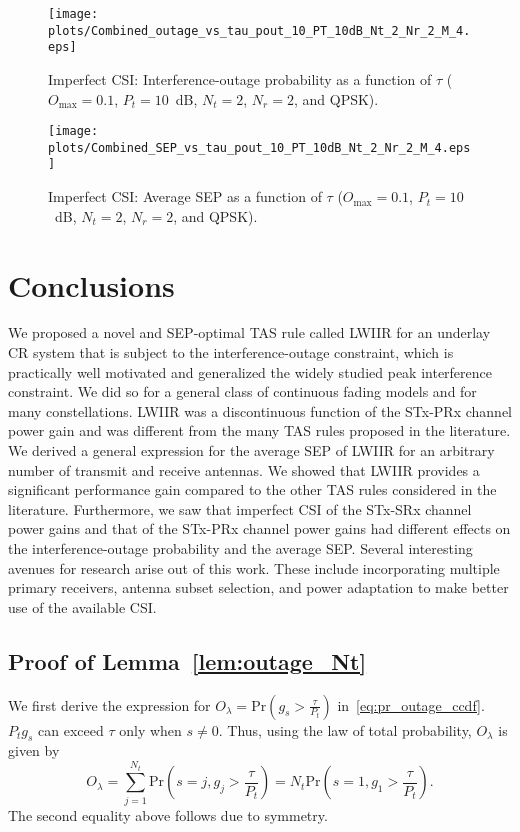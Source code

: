 \documentclass[12pt,draftcls,peerreview,onecolumn]{IEEEtran}
\newcommand{\brac}[1]{\left({#1}\right)}
\newcommand{\prob}[1]{\text{Pr}\brac{#1}}
\newcommand{\lam}{\lambda}
\newcommand{\Nt}{{N_t}}
\newcommand{\Nr}{{N_r}}
\newcommand{\Pt}{{P_t}}
\newcommand{\puch}{g}
\newcommand{\gk}[1]{{\puch_{#1}}}
\newcommand{\outmax}{O_{\text{max}}}
\newcommand{\itau}{\tau}
\newcommand{\out}{O}
\newcommand{\taubypt}{\frac{\itau}{\Pt}}
\newcommand{\gkgrtaubypt}[1]{{\gk{#1}}>\taubypt}
\newcommand{\outlam}{\out_{\lam}}
\begin{document}
\begin{figure}
	\centering
	 \texttt{[image: plots/Combined\_outage\_vs\_tau\_pout\_10\_PT\_10dB\_Nt\_2\_Nr\_2\_M\_4.eps]}
	\caption{Imperfect CSI: Interference-outage probability as a function of $\itau$ ($\outmax=0.1$, $\Pt = 10$~dB, $\Nt = 2$, $\Nr = 2$, and QPSK).}
	\label{fig:out_vs_tau_imp_CSI}
\end{figure}


\begin{figure}
	\centering \texttt{[image: plots/Combined\_SEP\_vs\_tau\_pout\_10\_PT\_10dB\_Nt\_2\_Nr\_2\_M\_4.eps]}
	\caption{Imperfect CSI: Average SEP as a function of $\itau$ ($\outmax=0.1$, $\Pt = 10$~dB, $\Nt = 2$, $\Nr = 2$, and QPSK).}
	\label{fig:sep_vs_tau_imp_CSI}
\end{figure}




\section{Conclusions}
\label{sec:conclusions}
We proposed a novel and SEP-optimal TAS rule called LWIIR for an underlay CR system that is subject to the interference-outage constraint, which is practically well motivated and generalized the widely studied peak interference constraint. We did so for a general class of continuous fading models and for many constellations. LWIIR was a discontinuous function of the STx-PRx channel power gain and was different from the many TAS rules proposed in the literature. We derived a general expression for the average SEP of LWIIR for an arbitrary number of transmit and receive antennas. We showed that LWIIR provides a significant performance gain compared to the other TAS rules considered in the literature. Furthermore, we saw that imperfect CSI of the STx-SRx channel power gains and that of the STx-PRx channel power gains had different effects on the interference-outage probability and the average SEP. Several interesting avenues for research arise out of this work. These include incorporating multiple primary receivers, antenna subset selection, and power adaptation to make better use of the available CSI.

\appendix
\subsection{Proof of Lemma~\ref{lem:outage_Nt}}
\label{proof:outage_Nt}
We first derive the expression for $\outlam = \prob{\gkgrtaubypt{s}}$ in~\eqref{eq:pr_outage_ccdf}. $\Pt \gk{s}$ can exceed  $\itau$ only when $s\neq0$. Thus, using the law of total probability, $\outlam$ is given by
%
\newcommand{\eqidx}{j}
\begin{equation}
\outlam =  \sum_{\eqidx=1}^{\Nt}\text{Pr}\brac{s=\eqidx,\gk{\eqidx}>\taubypt}=\Nt\text{Pr}\brac{s=1,\gk{1}>\taubypt}.
\label{eq:out_1}
\end{equation}
%
The second equality above follows due to symmetry.
\end{document}
